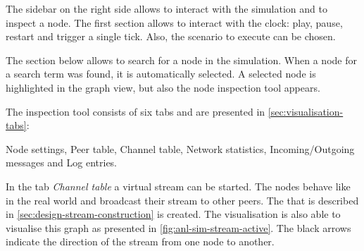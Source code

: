 The sidebar on the right side allows to interact with the simulation and to inspect a node. The first section allows to interact with the clock: play, pause, restart and trigger a single tick. Also, the scenario to execute can be chosen.

The section below allows to search for a node in the simulation. When a node for a search term was found, it is automatically selected. A selected node is highlighted in the graph view, but also the node inspection tool appears.

The inspection tool consists of six tabs and are presented in \vref{sec:visualisation-tabs}: 

Node settings, Peer table, Channel table, Network statistics, Incoming/Outgoing messages and Log entries. 

In the tab \textit{Channel table} a virtual stream can be started. The nodes behave like in the real world and broadcast their stream to other peers. The  that is described in \vref{sec:design-stream-construction} is created. The visualisation is also able to visualise this graph as presented in \vref{fig:anl-sim-stream-active}. The black arrows indicate the direction of the stream from one node to another.


